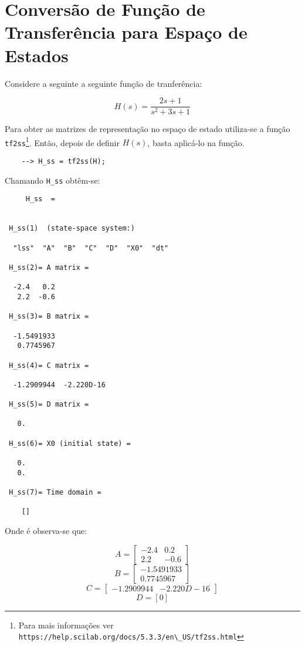 \section{Conversão de Função de Transferência para Espaço de Estados}
 Considere a seguinte a seguinte função de tranferência:
 
 $$H(s) = \frac{2s+1}{s^{2}+3s+1}$$
 
 Para obter as matrizes de representação no espaço de estado utiliza-se a função \verb|tf2ss|\footnote{Para mais informações ver \verb|https://help.scilab.org/docs/5.3.3/en\_US/tf2ss.html|}. Então, depois de definir $H(s)$, basta aplicá-lo na função.
 
 \begin{verbatim}
    --> H_ss = tf2ss(H);
 \end{verbatim}
 
 Chamando \verb|H_ss| obtêm-se:
 
 \begin{verbatim}
     H_ss  = 


 H_ss(1)  (state-space system:)

  "lss"  "A"  "B"  "C"  "D"  "X0"  "dt"

 H_ss(2)= A matrix =

  -2.4   0.2
   2.2  -0.6

 H_ss(3)= B matrix =

  -1.5491933
   0.7745967

 H_ss(4)= C matrix =

  -1.2909944  -2.220D-16

 H_ss(5)= D matrix =

   0.

 H_ss(6)= X0 (initial state) =

   0.
   0.

 H_ss(7)= Time domain =

    []
 \end{verbatim}
 
 Onde é observa-se que:
 
 $$
 A=\begin{bmatrix} 
    -2.4 & 0.2\\
     2.2 & -0.6 
 \end{bmatrix}
 $$
 $$
 B=\begin{bmatrix} 
    -1.5491933\\0.7745967
 \end{bmatrix}
 $$
 $$
 C=\begin{bmatrix} 
    -1.2909944 & -2.220D-16
 \end{bmatrix}
 $$
 $$
 D=[0]
 $$
 
